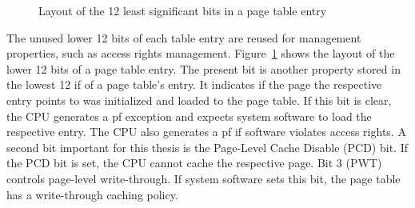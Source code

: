 
\begin{figure}
  \begin{center}
    
    \caption{Layout of the 12 least significant bits in a page table entry}
    \label{fig:state:technical:paging_rights}
  \end{center}
\end{figure}
The unused lower 12 bits of each table entry are reused for management
properties, such as access rights management.
Figure~\ref{fig:state:technical:paging_rights} shows the layout of the lower 12
bits of a page table entry. The present bit is another property stored in the
lowest 12 if of a page table's entry. It indicates if the page the respective
entry points to was initialized and loaded to the page table. If this bit is
clear, the CPU generates a \gls{pf} exception and expects system software to
load the respective entry. The CPU also generates a \gls{pf} if software
violates access rights. A second bit important for this thesis is the Page-Level
Cache Disable (PCD) bit. If the PCD bit is set, the CPU cannot cache the
respective page. Bit 3 (PWT) controls page-level write-through. If system
software sets this bit, the page table has a write-through caching policy.

